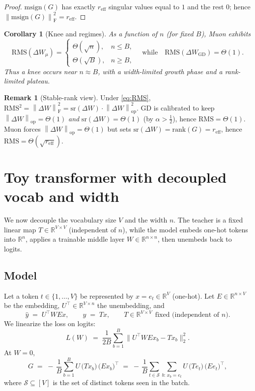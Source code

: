 \documentclass[11pt]{article}
\newtheorem{corollary}{Corollary}
\theoremstyle{definition}
\newtheorem{remark}{Remark}
\newcommand{\op}{\mathrm{op}}
\newcommand{\fro}{\mathrm{F}}
\newcommand{\sr}{\mathrm{sr}}
\newcommand{\msgn}{\mathrm{msign}}
\newcommand{\norm}[1]{\left\lVert#1\right\rVert}
\begin{document}
\begin{proof}
$\msgn(G)$ has exactly $r_{\mathrm{eff}}$ singular values equal to $1$ and the rest $0$; hence $\norm{\msgn(G)}_\fro^2=r_{\mathrm{eff}}$.
\end{proof}

\begin{corollary}[Knee and regimes]\label{cor:knee}
As a function of $n$ (for fixed $B$), Muon exhibits
\[
\mathrm{RMS}(\Delta W_\mu)=
\begin{cases}
\Theta(\sqrt{n}), & n\le B,\\
\Theta(\sqrt{B}), & n\ge B,
\end{cases}
\quad \text{while}\quad
\mathrm{RMS}(\Delta W_{\mathrm{GD}})=\Theta(1).
\]
Thus a knee occurs near $n\approx B$, with a width-limited growth phase and a rank-limited plateau.
\end{corollary}

\begin{remark}[Stable-rank view]
Under \eqref{eq:RMS}, $\mathrm{RMS}^2=\norm{\Delta W}_\fro^2=\sr(\Delta W)\cdot \norm{\Delta W}_\op^2$. GD is calibrated to keep $\norm{\Delta W}_\op=\Theta(1)$ \emph{and} $\sr(\Delta W)=\Theta(1)$ (by $\alpha>\tfrac12$), hence $\mathrm{RMS}=\Theta(1)$. Muon forces $\norm{\Delta W}_\op=\Theta(1)$ but sets $\sr(\Delta W)=\mathrm{rank}(G)=r_{\mathrm{eff}}$, hence $\mathrm{RMS}=\Theta(\sqrt{r_{\mathrm{eff}}})$.
\end{remark}

\section{Toy transformer with decoupled vocab and width}

We now decouple the vocabulary size $V$ and the width $n$. The teacher is a fixed linear map $T\in\mathbb{R}^{V\times V}$ (independent of $n$), while the model embeds one-hot tokens into $\mathbb{R}^n$, applies a trainable middle layer $W\in\mathbb{R}^{n\times n}$, then unembeds back to logits.

\subsection*{Model}
Let a token $t\in\{1,\dots,V\}$ be represented by $x=e_t\in\mathbb{R}^V$ (one-hot). Let $E\in\mathbb{R}^{n\times V}$ be the embedding, $U^\top\in\mathbb{R}^{V\times n}$ the unembedding, and
\[
\hat y \;=\; U^\top W E x,\qquad y \;=\; T x,\qquad T\in\mathbb{R}^{V\times V}\ \ \text{fixed (independent of $n$)}.
\]
We linearize the loss on logits:
\[
L(W)\;=\;\frac{1}{2B}\sum_{b=1}^B \big\|U^\top W E x_b - T x_b\big\|_2^2.
\]
At $W=0$,
\begin{equation}\label{eq:Gx-decoupled}
G \;=\; -\,\frac1B \sum_{b=1}^B U\, \big(T x_b\big)\, \big(E x_b\big)^\top
\;=\; -\,\frac1B \sum_{t\in \mathcal{S}} \sum_{b:\,x_b=e_t} U\,\big(T e_t\big)\,\big(E e_t\big)^\top,
\end{equation}
where $\mathcal{S}\subseteq[V]$ is the set of distinct tokens seen in the batch.
\end{document}

